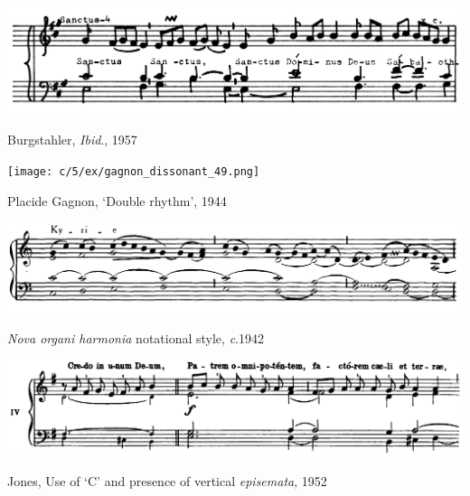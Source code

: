 \vspace*{\fill}

\begin{example}
  \centering
  \includegraphics[width=\linewidth]{c/5/ex/burgstahler_quartal_66.png}
  \caption{Burgstahler, \emph{Ibid}., 1957}
  \label{mus:burgstahler_quartal_66}
\end{example}


\vspace*{\fill}

\newpage

\vspace*{\fill}

\begin{example}
  \centering
  \texttt{[image: c/5/ex/gagnon\_dissonant\_49.png]}
  \caption{Placide Gagnon, `Double rhythm', 1944}
  \label{mus:gagnon_dissonant_49}
\end{example}

\vspace*{\fill}

\begin{example}
  \centering
  \includegraphics[width=\linewidth]{c/4/ex/noh_42.png}
  \caption{\emph{Nova organi harmonia} notational style, \emph{c}.1942}
  \label{mus:noh_42}
\end{example}

\vspace*{\fill}

\newpage

\vspace*{\fill}

\begin{example}
  \centering
  \includegraphics[width=\linewidth]{c/5/ex/jones_ictus_15.png}
  \caption{Jones, Use of `C'\kern 1pt\sharp{} and presence of vertical \emph{episemata}, 1952}
  \label{mus:jones_ictus_15}
\end{example}

